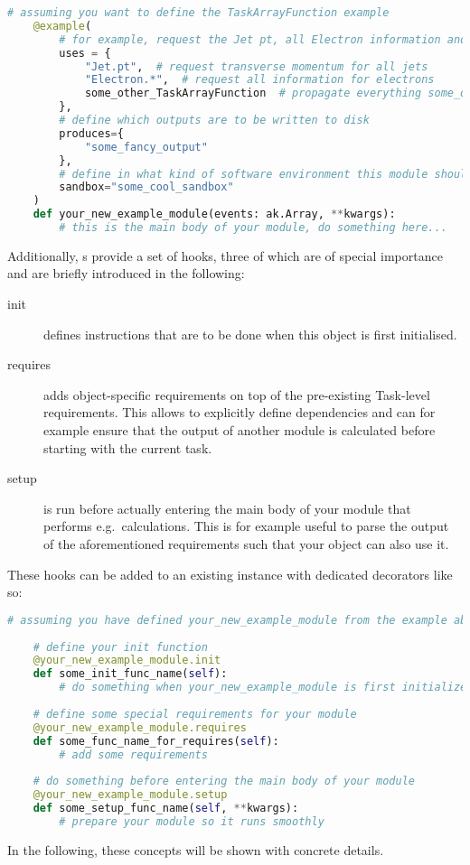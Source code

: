 \begin{lstlisting}[language=python]
	# assuming you want to define the TaskArrayFunction example
	@example(
		# for example, request the Jet pt, all Electron information and everything another 
		uses = {
			"Jet.pt",  # request transverse momentum for all jets
			"Electron.*",  # request all information for electrons
			some_other_TaskArrayFunction  # propagate everything some_other_TaskArrayFunction needs to this example TaskArrayFunction
	    },
	    # define which outputs are to be written to disk
	    produces={
	    	"some_fancy_output"
	    },
	    # define in what kind of software environment this module should be run
	    sandbox="some_cool_sandbox"
	)
	def your_new_example_module(events: ak.Array, **kwargs):
	    # this is the main body of your module, do something here...
\end{lstlisting}

Additionally, s provide a set of hooks, three of which are of special importance and are briefly introduced in the following:
\begin{description}
	\item[init] defines instructions that are to be done when this object is first initialised.
	\item[requires] adds object-specific requirements on top of the pre-existing Task-level requirements.
	This allows to explicitly define dependencies and can for example ensure that the output of another module is calculated before starting with the current task.
	\item[setup] is run before actually entering the main body of your module that performs e.g.\ calculations.
	This is for example useful to parse the output of the aforementioned requirements such that your object can also use it.
	
\end{description}

These hooks can be added to an existing   instance with dedicated decorators like so:

\begin{lstlisting}[language=python]
	# assuming you have defined your_new_example_module from the example above
	
	# define your init function
	@your_new_example_module.init
	def some_init_func_name(self):
	    # do something when your_new_example_module is first initialized
	    
	# define some special requirements for your module
	@your_new_example_module.requires
	def some_func_name_for_requires(self):
	    # add some requirements
	
	# do something before entering the main body of your module
	@your_new_example_module.setup
	def some_setup_func_name(self, **kwargs):
	    # prepare your module so it runs smoothly
\end{lstlisting}

In the following, these concepts will be shown with concrete details.
